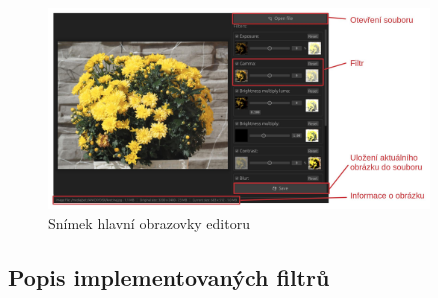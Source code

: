 \documentclass[11pt, a4paper, titlepage]{article}
\begin{document}
\begin{figure}
    \centering
    \includegraphics[width=0.9\textwidth]{screenshot.jpg}
    \caption{Snímek hlavní obrazovky editoru}
    \label{fig:screenshot}
\end{figure}

\subsection{Popis implementovaných filtrů}
\end{document}
